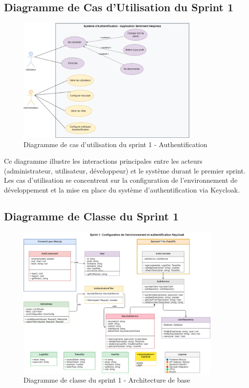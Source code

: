 \subsection{Diagramme de Cas d'Utilisation du Sprint 1}

\begin{figure}[H]
\centering
\includegraphics[width=0.8\textwidth]{assets/images/auth-usecase.png} 
\caption{Diagramme de cas d'utilisation du sprint 1 - Authentification}
\label{fig:sprint1-usecase}
\end{figure}

Ce diagramme illustre les interactions principales entre les acteurs (administrateur, utilisateur, développeur) et le système durant le premier sprint. Les cas d'utilisation se concentrent sur la configuration de l'environnement de développement et la mise en place du système d'authentification via Keycloak.

\subsection{Diagramme de Classe du Sprint 1}

\begin{figure}[H]
\centering
\includegraphics[width=0.9\textwidth]{assets/images/sprint1-class.png}
\caption{Diagramme de classe du sprint 1 - Architecture de base}
\label{fig:sprint1-class}
\end{figure}


